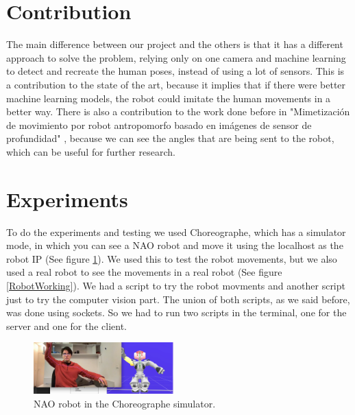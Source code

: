 \documentclass[conference]{IEEEtran}
\begin{document}
\section{Contribution}
The main difference between our project and the others is that it has a different approach to solve the problem, relying only on one camera and machine learning to detect and recreate the human poses, instead of using a lot of sensors. This is a contribution to the state of the art, because it implies that if there were better machine learning models, the robot could imitate the human movements in a better way. 
There is also a contribution to the work done before in "Mimetización de movimiento por robot antropomorfo basado en imágenes de sensor de profundidad" \cite{b3}, because we can see the angles that are being sent to the robot, which can be useful for further research.


\section{Experiments}
To do the experiments and testing we used Choreographe, which has a simulator mode, in which you can see a NAO robot and move it using the localhost as the robot IP (See figure \ref{RobotSimulation}). We used this to test the robot movements, but we also used a real robot to see the movements in a real robot (See figure \ref{RobotWorking}).
We had a script to try the robot movments and another script just to try the computer vision part. The union of both scripts, as we said before, was done using sockets. So we had to run two scripts in the terminal, one for the server and one for the client.
\begin{figure}[htbp]
\centerline{\includegraphics[width=0.48\textwidth]{images/RobotSimulation.png}}
\caption{NAO robot in the Choreographe simulator.}
\label{RobotSimulation}
\end{figure}
\end{document}
